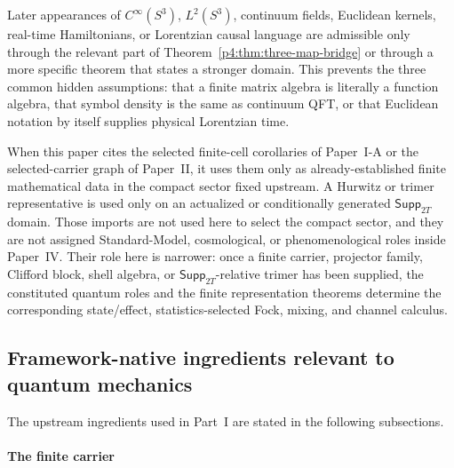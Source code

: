 \documentclass[12pt,a4paper]{article}
\begin{document}
\begin{remark}
\label{p4:rem:three-map-bridge-export}
Later appearances of \(C^\infty(S^3)\), \(L^2(S^3)\), continuum fields, Euclidean kernels, real-time Hamiltonians, or Lorentzian causal language are admissible only through the relevant part of Theorem~\ref{p4:thm:three-map-bridge} or through a more specific theorem that states a stronger domain.
This prevents the three common hidden assumptions: that a finite matrix algebra is literally a function algebra, that symbol density is the same as continuum QFT, or that Euclidean notation by itself supplies physical Lorentzian time.
\end{remark}


\begin{remark}
\label{p4:rem:series-selected-finite-operator-imports}
When this paper cites the selected finite-cell corollaries of Paper~I-A or the
selected-carrier graph of Paper~II, it uses them only as already-established
finite mathematical data in the compact sector fixed upstream.  A Hurwitz or
trimer representative is used only on an actualized or conditionally
generated \(\mathsf{Supp}_{2T}\) domain.  Those imports are not used here to select
the compact sector, and they are not assigned Standard-Model, cosmological,
or phenomenological roles inside Paper~IV.  Their role here is narrower:
once a finite carrier, projector family, Clifford block, shell algebra, or
\(\mathsf{Supp}_{2T}\)-relative trimer has been supplied, the constituted
quantum roles and the finite representation theorems determine the
corresponding state/effect, statistics-selected Fock, mixing, and channel
calculus.
\end{remark}




\subsection{Framework-native ingredients relevant to quantum mechanics}
\label{p4:sec:part1-native}

The upstream ingredients used in Part~I are stated in the following subsections.



\paragraph{The finite carrier}
\label{p4:sec:part1-native-carrier}
\end{document}
